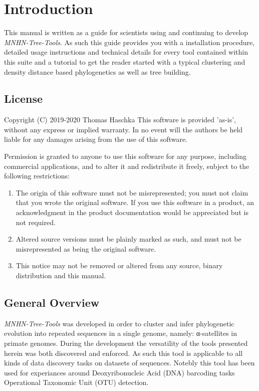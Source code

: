 \chapter{Introduction}

This manual is written as a guide for scientists using and continuing to
develop \emph{MNHN-Tree-Tools}. As such this guide provides you with a
installation procedure, detailed usage instructions and technical
details for every tool contained within this suite and a tutorial to get
the reader started with a typical clustering and density distance
based phylogenetics as well as tree building.

\section{License}
Copyright (C) 2019-2020 Thomas Haschka \newline
This software is provided 'as-is', without any express or implied
warranty.  In no event will the authors be held liable for any damages
arising from the use of this software.

Permission is granted to anyone to use this software for any purpose,
including commercial applications, and to alter it and redistribute it
freely, subject to the following restrictions:

\begin{enumerate}
  \item The origin of this software must not be misrepresented; you must not
    claim that you wrote the original software. If you use this software
   in a product, an acknowledgment in the product documentation would be
   appreciated but is not required.
  \item Altered source versions must be plainly marked as such, and must not be
    misrepresented as being the original software.
  \item This notice may not be removed or altered from any source,
    binary distribution and this manual.
\end{enumerate}

\section{General Overview}

\emph{MNHN-Tree-Tools} was developed in order to cluster and infer
phylogenetic evolution into repeated sequences in a single genome,
namely: α-satellites in primate genomes. During the development
the versatility of the tools presented herein was both discovered and
enforced. As such this tool is applicable to all kinds of data
discovery tasks on datasets of sequences. Notebly this tool has been
used for experiances around Deoxyribonucleic Acid (DNA) barcoding tasks
Operational Taxonomic Unit (OTU) detection.

